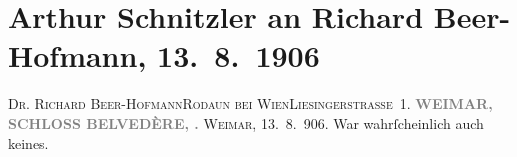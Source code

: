 

         
         \renewcommand{\erwaehntePersonen}{Personen: Richard Beer-Hofmann}
         \renewcommand{\erwaehnteOrte}{Orte: Belvedere, Liesingerstraße, Rodaun, Weimar}
         \renewcommand{\erwaehnteWerke}{}
               \section[Arthur Schnitzler an Richard Beer-Hofmann, 13. 8. 1906]{ Arthur Schnitzler an Richard Beer-Hofmann, 13. 8. 1906}\nopagebreak{}\rehead{ }\begin{ledgroupsized}[t]{13cm}\normalsize\beginnumbering \toendnotes[C]{\smallbreak\pagebreak[2]} 
\toendnotes[C]{\smallbreak}\pstart{}{\pb}\textsc{Dr. Richard Beer-Hofmann}\pend{}\pstart{}\textsc{Rodaun bei Wien}\pend{}\pstart{}\textsc{Liesingerstraße 1}.\pend{}{\bigskip}\pstart
           \noindent{}\centering{}{\pb}\textcolor{gray}{\textbf{WEIMAR, SCHLOSS BELVEDÈRE,{ }\label{K_L01623_1v}\label{K_L01623_1h}.}}\pend
           \pstart
           \raggedleft{}\textsc{Weimar}, 13. 8. 906.\pend
           \pstart
           War wahrſcheinlich auch keines.\pend
           
         
         \endnumbering{}\end{ledgroupsized}  \newcommand{\dateiname}{L01623}\newcommand{\titel}{Arthur Schnitzler an Richard Beer-Hofmann, 13. 8. 1906}\newcommand{\editorInnen}{Martin Anton Müller und Gerd-Hermann Susen}
      